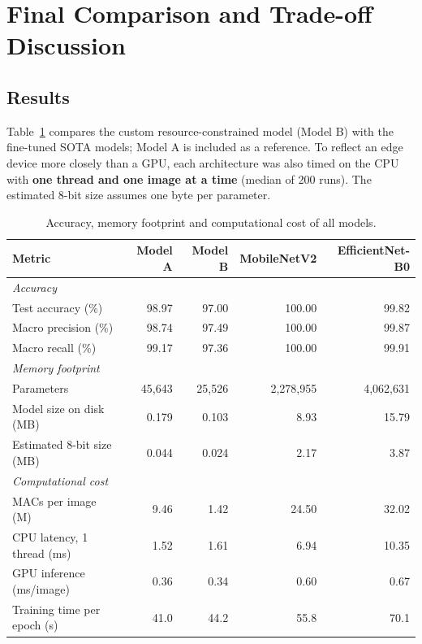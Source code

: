 \documentclass[11pt, a4paper]{article}
\begin{document}
\section{Final Comparison and Trade-off Discussion}
\label{sec:final}

\subsection{Results}

Table~\ref{tab:final} compares the custom resource-constrained model (Model B) with the fine-tuned SOTA models;
Model A is included as a reference. To reflect an edge device more closely than a GPU, each architecture was also
timed on the CPU with \textbf{one thread and one image at a time} (median of 200 runs). The estimated 8-bit size
assumes one byte per parameter.

\begin{table}[H]
\centering
\caption{Accuracy, memory footprint and computational cost of all models.}
\label{tab:final}
\begin{tabular}{lrrrr}
\toprule
\textbf{Metric} & \textbf{Model A} & \textbf{Model B} & \textbf{MobileNetV2} & \textbf{EfficientNet-B0} \\
\midrule
\multicolumn{5}{l}{\emph{Accuracy}} \\
Test accuracy (\%)              & 98.97 & 97.00 & 100.00 & 99.82 \\
Macro precision (\%)            & 98.74 & 97.49 & 100.00 & 99.87 \\
Macro recall (\%)               & 99.17 & 97.36 & 100.00 & 99.91 \\
\midrule
\multicolumn{5}{l}{\emph{Memory footprint}} \\
Parameters                      & 45,643 & 25,526 & 2,278,955 & 4,062,631 \\
Model size on disk (MB)         & 0.179  & 0.103  & 8.93      & 15.79 \\
Estimated 8-bit size (MB)       & 0.044  & 0.024  & 2.17      & 3.87 \\
\midrule
\multicolumn{5}{l}{\emph{Computational cost}} \\
MACs per image (M)              & 9.46   & 1.42   & 24.50     & 32.02 \\
CPU latency, 1 thread (ms)      & 1.52   & 1.61   & 6.94      & 10.35 \\
GPU inference (ms/image)        & 0.36   & 0.34   & 0.60      & 0.67 \\
Training time per epoch (s)     & 41.0   & 44.2   & 55.8      & 70.1 \\
\bottomrule
\end{tabular}
\end{table}
\end{document}
